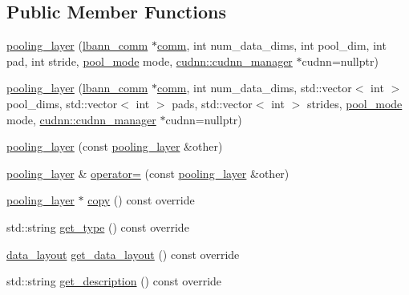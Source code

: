 \subsection*{Public Member Functions}
\begin{DoxyCompactItemize}
\item 
\hyperlink{classlbann_1_1pooling__layer_a012223832bcd60644724425488059152}{pooling\+\_\+layer} (\hyperlink{classlbann_1_1lbann__comm}{lbann\+\_\+comm} $\ast$\hyperlink{file__io_8cpp_ab048c6f9fcbcfaa57ce68b00263dbebe}{comm}, int num\+\_\+data\+\_\+dims, int pool\+\_\+dim, int pad, int stride, \hyperlink{base_8hpp_ac47a6ee5278a53898222a48639a2bf39}{pool\+\_\+mode} mode, \hyperlink{classlbann_1_1cudnn_1_1cudnn__manager}{cudnn\+::cudnn\+\_\+manager} $\ast$cudnn=nullptr)
\item 
\hyperlink{classlbann_1_1pooling__layer_ad0694acb2188cb539a1ae616846600c3}{pooling\+\_\+layer} (\hyperlink{classlbann_1_1lbann__comm}{lbann\+\_\+comm} $\ast$\hyperlink{file__io_8cpp_ab048c6f9fcbcfaa57ce68b00263dbebe}{comm}, int num\+\_\+data\+\_\+dims, std\+::vector$<$ int $>$ pool\+\_\+dims, std\+::vector$<$ int $>$ pads, std\+::vector$<$ int $>$ strides, \hyperlink{base_8hpp_ac47a6ee5278a53898222a48639a2bf39}{pool\+\_\+mode} mode, \hyperlink{classlbann_1_1cudnn_1_1cudnn__manager}{cudnn\+::cudnn\+\_\+manager} $\ast$cudnn=nullptr)
\item 
\hyperlink{classlbann_1_1pooling__layer_aab33e9b05ae9fffe36333feabbee9895}{pooling\+\_\+layer} (const \hyperlink{classlbann_1_1pooling__layer}{pooling\+\_\+layer} \&other)
\item 
\hyperlink{classlbann_1_1pooling__layer}{pooling\+\_\+layer} \& \hyperlink{classlbann_1_1pooling__layer_acd09fc03a5c22c4127222b722c4d6ce5}{operator=} (const \hyperlink{classlbann_1_1pooling__layer}{pooling\+\_\+layer} \&other)
\item 
\hyperlink{classlbann_1_1pooling__layer}{pooling\+\_\+layer} $\ast$ \hyperlink{classlbann_1_1pooling__layer_a58f9e6223649bb79ad10a2411602d71d}{copy} () const override
\item 
std\+::string \hyperlink{classlbann_1_1pooling__layer_a2af67eebe2d051b141253bdba18f54ff}{get\+\_\+type} () const override
\item 
\hyperlink{base_8hpp_a786677cbfb3f5677b4d84f3056eb08db}{data\+\_\+layout} \hyperlink{classlbann_1_1pooling__layer_ad6d7e7476521ed4a4c43db493807b2ca}{get\+\_\+data\+\_\+layout} () const override
\item 
std\+::string \hyperlink{classlbann_1_1pooling__layer_a11f6d5c7ef16a62d081164f174825ab2}{get\+\_\+description} () const override

\end{DoxyCompactItemize}
